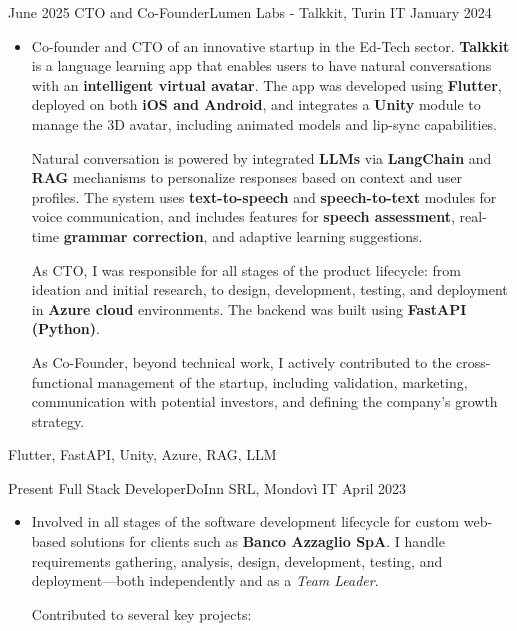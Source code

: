 \begin{experiences}

\experience
{June 2025}   {CTO and Co-Founder}{Lumen Labs - Talkkit, Turin IT}
{January 2024} {
	\begin{itemize}
	\item Co-founder and CTO of an innovative startup in the Ed-Tech sector. \textbf{Talkkit} is a language learning app that enables users to have natural conversations with an \textbf{intelligent virtual avatar}. The app was developed using \textbf{Flutter}, deployed on both \textbf{iOS and Android}, and integrates a \textbf{Unity} module to manage the 3D avatar, including animated models and lip-sync capabilities.

Natural conversation is powered by integrated \textbf{LLMs} via \textbf{LangChain} and \textbf{RAG} mechanisms to personalize responses based on context and user profiles. The system uses \textbf{text-to-speech} and \textbf{speech-to-text} modules for voice communication, and includes features for \textbf{speech assessment}, real-time \textbf{grammar correction}, and adaptive learning suggestions.

	As CTO, I was responsible for all stages of the product lifecycle: from ideation and initial research, to design, development, testing, and deployment in \textbf{Azure cloud} environments. The backend was built using \textbf{FastAPI (Python)}.

	As Co-Founder, beyond technical work, I actively contributed to the cross-functional management of the startup, including validation, marketing, communication with potential investors, and defining the company’s growth strategy.
\end{itemize}

}
{Flutter, FastAPI, Unity, Azure, RAG, LLM}

\emptySeparator
\emptySeparator

\experience
{Present}   {Full Stack Developer}{DoInn SRL, Mondovì IT}
{April 2023} {
	\begin{itemize}
	\item Involved in all stages of the software development lifecycle for custom web-based solutions for clients such as \textbf{Banco Azzaglio SpA}. I handle requirements gathering, analysis, design, development, testing, and deployment—both independently and as a \textit{Team Leader}.

	Contributed to several key projects:


\end{itemize}}
\end{experiences}
